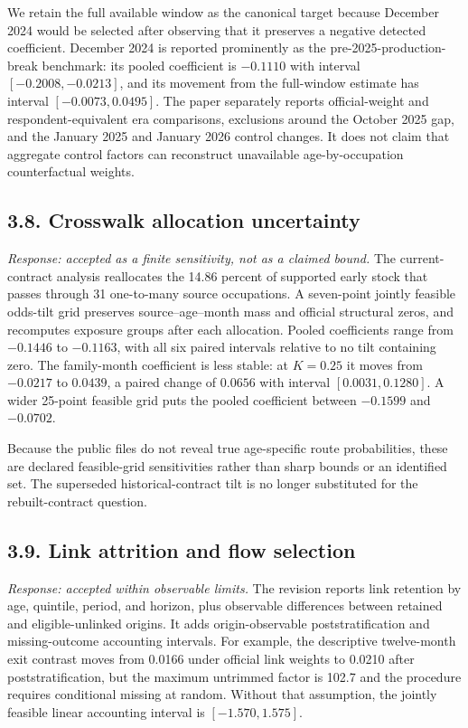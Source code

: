 \documentclass[11pt,letterpaper]{article}
\begin{document}
We retain the full available window as the canonical target because December 2024 would be selected after observing that it preserves a negative detected coefficient.  December 2024 is reported prominently as the pre-2025-production-break benchmark: its pooled coefficient is $-0.1110$ with interval $[-0.2008,-0.0213]$, and its movement from the full-window estimate has interval $[-0.0073,0.0495]$.  The paper separately reports official-weight and respondent-equivalent era comparisons, exclusions around the October 2025 gap, and the January 2025 and January 2026 control changes.  It does not claim that aggregate control factors can reconstruct unavailable age-by-occupation counterfactual weights.

\subsection*{3.8. Crosswalk allocation uncertainty}

\emph{Response: accepted as a finite sensitivity, not as a claimed bound.}  The current-contract analysis reallocates the 14.86 percent of supported early stock that passes through 31 one-to-many source occupations.  A seven-point jointly feasible odds-tilt grid preserves source--age--month mass and official structural zeros, and recomputes exposure groups after each allocation.  Pooled coefficients range from $-0.1446$ to $-0.1163$, with all six paired intervals relative to no tilt containing zero.  The family-month coefficient is less stable: at $K=0.25$ it moves from $-0.0217$ to $0.0439$, a paired change of $0.0656$ with interval $[0.0031,0.1280]$.  A wider 25-point feasible grid puts the pooled coefficient between $-0.1599$ and $-0.0702$.

Because the public files do not reveal true age-specific route probabilities, these are declared feasible-grid sensitivities rather than sharp bounds or an identified set.  The superseded historical-contract tilt is no longer substituted for the rebuilt-contract question.

\subsection*{3.9. Link attrition and flow selection}

\emph{Response: accepted within observable limits.}  The revision reports link retention by age, quintile, period, and horizon, plus observable differences between retained and eligible-unlinked origins.  It adds origin-observable poststratification and missing-outcome accounting intervals.  For example, the descriptive twelve-month exit contrast moves from 0.0166 under official link weights to 0.0210 after poststratification, but the maximum untrimmed factor is 102.7 and the procedure requires conditional missing at random.  Without that assumption, the jointly feasible linear accounting interval is $[-1.570,1.575]$.
\end{document}
